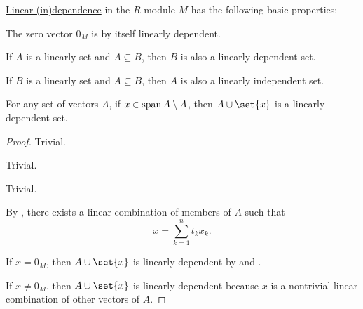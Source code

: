\begin{proposition}\label{thm:def:linear_dependence}
  \hyperref[def:linear_dependence]{Linear (in)dependence} in the \( R \)-module \( M \) has the following basic properties:
  \begin{thmenum}
     The zero vector \( 0_M \) is by itself linearly dependent.

     If \( A \) is a linearly  set and \( A \subseteq B \), then \( B \) is also a linearly dependent set.

     If \( B \) is a linearly  set and \( A \subseteq B \), then \( A \) is also a linearly independent set.

     For any set of vectors \( A \), if \( x \in \operatorname{span} A \setminus A \), then \( A \cup \set{ x } \) is a linearly dependent set.
  \end{thmenum}
\end{proposition}
\begin{proof}
   Trivial.

   Trivial.

   Trivial.

   By , there exists a linear combination of members of \( A \) such that
  \begin{equation*}
    x = \sum_{k=1}^n t_k x_k.
  \end{equation*}

  If \( x = 0_M \), then \( A \cup \set{ x } \) is linearly dependent by  and .

  If \( x \neq 0_M \), then \( A \cup \set{ x } \) is linearly dependent because \( x \) is a nontrivial linear combination of other vectors of \( A \).
\end{proof}

